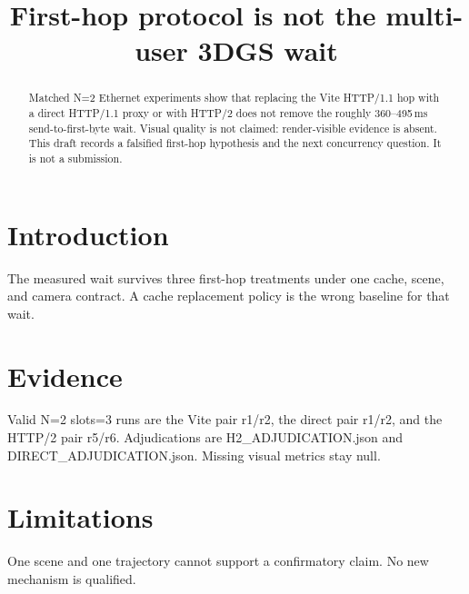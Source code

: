\documentclass[sigconf,anonymous,review]{acmart}
\begin{document}
\title{First-hop protocol is not the multi-user 3DGS wait}
\begin{abstract}
Matched N=2 Ethernet experiments show that replacing the Vite HTTP/1.1 hop with a direct HTTP/1.1 proxy or with HTTP/2 does not remove the roughly 360--495\,ms send-to-first-byte wait. Visual quality is not claimed: render-visible evidence is absent. This draft records a falsified first-hop hypothesis and the next concurrency question. It is not a submission.
\end{abstract}
\maketitle
\section{Introduction}
The measured wait survives three first-hop treatments under one cache, scene, and camera contract. A cache replacement policy is the wrong baseline for that wait.
\section{Evidence}
Valid N=2 slots=3 runs are the Vite pair r1/r2, the direct pair r1/r2, and the HTTP/2 pair r5/r6. Adjudications are H2\_ADJUDICATION.json and DIRECT\_ADJUDICATION.json. Missing visual metrics stay null.
\section{Limitations}
One scene and one trajectory cannot support a confirmatory claim. No new mechanism is qualified.
\end{document}
